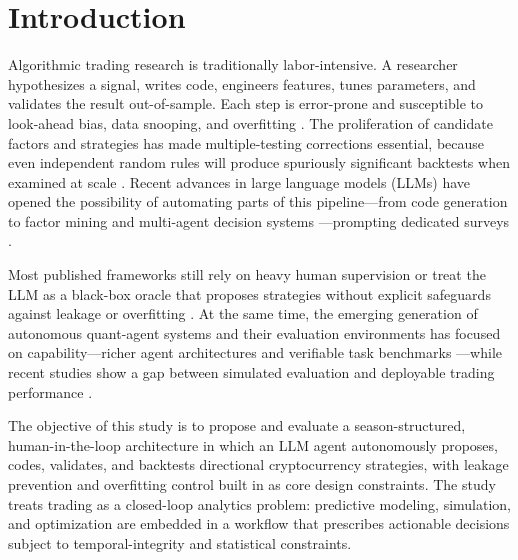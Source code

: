 \documentclass[11pt,a4paper]{article}
\date{}
\begin{document}
\section{Introduction}\label{introduction}

Algorithmic trading research is traditionally labor-intensive. A researcher hypothesizes a signal, writes code, engineers features, tunes parameters, and validates the result out-of-sample. Each step is error-prone and susceptible to look-ahead bias, data snooping, and overfitting \citep{bailey_2014,harvey_2015}. The proliferation of candidate factors and strategies has made multiple-testing corrections essential, because even independent random rules will produce spuriously significant backtests when examined at scale \citep{harvey_2016}. Recent advances in large language models (LLMs) have opened the possibility of automating parts of this pipeline---from code generation \citep{chen_2021} to factor mining \citep{wang_2023} and multi-agent decision systems \citep{kou_2024}---prompting dedicated surveys \citep{fu_2025}.

Most published frameworks still rely on heavy human supervision or treat the LLM as a black-box oracle that proposes strategies without explicit safeguards against leakage or overfitting \citep{bailey_2014, kaufman_2012, sobreiro_2026}. At the same time, the emerging generation of autonomous quant-agent systems and their evaluation environments has focused on capability—richer agent architectures and verifiable task benchmarks \citep{jadhav_mirza_2025, zhang_2024_finagent}—while recent studies show a gap between simulated evaluation and deployable trading performance \citep{liu_2021, sobreiro_2026}.

The objective of this study is to propose and evaluate a season-structured, human-in-the-loop architecture in which an LLM agent autonomously proposes, codes, validates, and backtests directional cryptocurrency strategies, with leakage prevention and overfitting control built in as core design constraints. The study treats trading as a closed-loop analytics problem: predictive modeling, simulation, and optimization are embedded in a workflow \citep{shmueli_2011, bertsimas_2020} that prescribes actionable decisions subject to temporal-integrity and statistical constraints.
\end{document}

